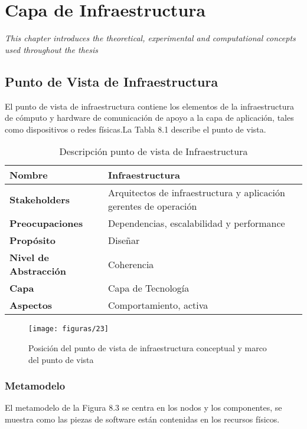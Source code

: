 \chapter{Capa de Infraestructura}
\label{chap:Infraestructura}
\textit{This chapter introduces the theoretical, experimental and computational concepts used throughout the thesis}
\vspace{2ex}\vfill
\minitoc
\newpage

\section{Punto de Vista de Infraestructura}
El punto de vista de infraestructura contiene los elementos de la infraestructura de cómputo y hardware de comunicación de apoyo a la capa de aplicación, tales como dispositivos o redes físicas.La Tabla 8.1 describe el punto de vista.

  \begin{table}[H]
  	\centering
  	\begin{tabular}{lp{8cm}}
  		\toprule
  		\textbf{Nombre} & \textbf{Infraestructura} \\
  		\midrule
  		\textbf{Stakeholders} & Arquitectos de infraestructura y aplicación gerentes de operación \\
  		\textbf{Preocupaciones} & Dependencias, escalabilidad y performance  \\
  		\textbf{Propósito} & Diseñar \\
  		\textbf{Nivel de Abstracción} & Coherencia \\
  		\textbf{Capa} & Capa de Tecnología \\
  		\textbf{Aspectos} & Comportamiento, activa \\
  		\bottomrule
  	\end{tabular}
  	\captionsetup{width=.95\textwidth}
  	\caption{Descripción punto de vista de Infraestructura}
  	\label{tabla14}
  \end{table}

  \begin{figure}[H]
	\centering
	\texttt{[image: figuras/23]}
	\captionsetup{width=.95\textwidth}
	\caption{Posición del punto de vista de infraestructura conceptual y marco del punto de vista}
	\label{figura23}
  \end{figure}

  \subsection{Metamodelo}
  El metamodelo de la Figura 8.3 se centra en los nodos y los componentes, se muestra como las piezas de software están contenidas en los recursos físicos.

